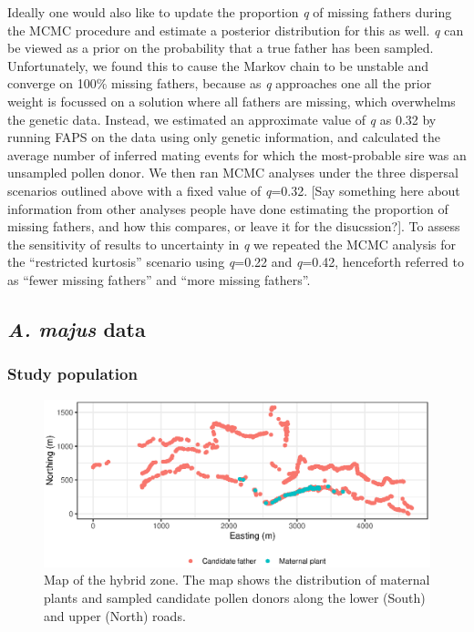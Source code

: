 \documentclass[10pt, a4paper, twocolumn]{article} %
\begin{document}
Ideally one would also like to update the proportion \textit{q} of missing fathers during the MCMC procedure and estimate a posterior distribution for this as well. \textit{q} can be viewed as a prior on the probability that a true father has been sampled. Unfortunately, we found this to cause the Markov chain to be unstable and converge on 100\% missing fathers, because as \textit{q} approaches one all the prior weight is focussed on a solution where all fathers are missing, which overwhelms the genetic data. Instead, we estimated an approximate value of \textit{q} as 0.32 by running FAPS on the data using only genetic information, and calculated the average number of inferred mating events for which the most-probable sire was an unsampled pollen donor. We then ran MCMC analyses under the three dispersal scenarios outlined above with a fixed value of \textit{q}=0.32. [Say something here about information from other analyses people have done estimating the proportion of missing fathers, and how this compares, or leave it for the disucssion?]. To assess the sensitivity of results to uncertainty in \textit{q} we repeated the MCMC analysis for the “restricted kurtosis” scenario using \textit{q}=0.22 and \textit{q}=0.42, henceforth referred to as “fewer missing fathers” and “more missing fathers”.

\subsection{\textit{A. majus} data}

\subsubsection{Study population}

\begin{figure}
    \centering
	\includegraphics[]{map.eps} %
	\caption{Map of the hybrid zone. The map shows the distribution of maternal plants and sampled candidate pollen donors along the lower (South) and upper (North) roads.}
	\label{map} %
\end{figure}
\end{document}

